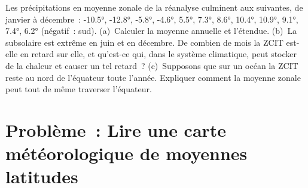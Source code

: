 \begin{exercise}[$\star\star\star$]\label{exo:b1:atmospheric-circulation:12}
Les précipitations en moyenne zonale de la réanalyse culminent aux  suivantes, de
janvier à décembre~: \ang{-10.5}, \ang{-12.8}, \ang{-5.8}, \ang{-4.6}, \ang{5.5},
\ang{7.3}, \ang{8.6}, \ang{10.4}, \ang{10.9}, \ang{9.1}, \ang{7.4}, \ang{6.2}
(négatif~: sud). (a)~Calculer la moyenne annuelle et l'étendue. (b)~La  subsolaire
est extrême en juin et en décembre. De combien de mois la ZCIT est-elle en retard
sur elle, et qu'est-ce qui, dans le système climatique, peut stocker de la chaleur et causer un tel retard~?
(c)~Supposons que sur un océan la ZCIT reste au nord de l'équateur toute l'année. Expliquer
comment la moyenne zonale peut tout de même traverser l'équateur.
\end{exercise}

\section{Problème~: Lire une carte météorologique de moyennes latitudes}

